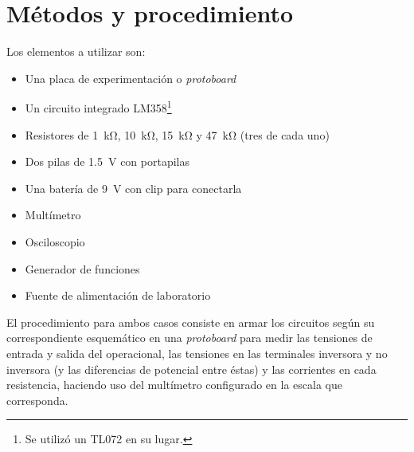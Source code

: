 \section{Métodos y procedimiento}

Los elementos a utilizar son:

\begin{itemize}
    \item Una placa de experimentación o \textit{protoboard}
    \item Un circuito integrado LM358\footnote{Se utilizó un TL072 en su lugar.}
    \item Resistores de \SI{1}{\kilo\ohm}, \SI{10}{\kilo\ohm},
        \SI{15}{\kilo\ohm} y \SI{47}{\kilo\ohm} (tres de cada uno)
    \item Dos pilas de \SI{1.5}{\volt} con portapilas
    \item Una batería de \SI{9}{\volt} con clip para conectarla
    \item Multímetro
    \item Osciloscopio
    \item Generador de funciones
    \item Fuente de alimentación de laboratorio
\end{itemize}

El procedimiento para ambos casos consiste en armar los circuitos según su 
correspondiente esquemático en una \textit{protoboard} para medir las tensiones
de entrada y salida del operacional, las tensiones en las terminales inversora y
no inversora (y las diferencias de potencial entre éstas) y las corrientes en
cada resistencia, haciendo uso del multímetro configurado en la escala que
corresponda.
